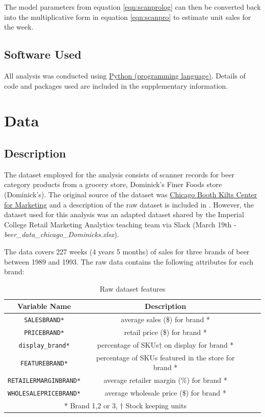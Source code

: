\documentclass[a4paper,11pt]{article}
\begin{document}
The model parameters from equation \ref{eqn:scanprolog} can then be converted back into the multiplicative form in equation \ref{eqn:scanpro} to estimate unit sales for the week.


\subsection{Software Used}

All analysis was conducted using \href{https://www.python.org/}{Python (programming language)}. Details of code and packages used are included in the supplementary information.


\section{Data}
\subsection{Description}
The dataset employed for the analysis consists of scanner records for beer category products from a grocery store, Dominick's Finer Foods store (Dominick's). The original source of the dataset was  \href{https://www.chicagobooth.edu/research/kilts/datasets/dominicks}{Chicago Booth Kilts Center for Marketing} and a description of the raw dataset is included in \citet{srinivasan_promotions_2004}. However, the dataset used for this analysis was an adapted dataset shared by the Imperial College Retail Marketing Analytics teaching team via Slack (March 19th - \emph{beer\_data\_chicago\_Dominicks.xlsx}).

The data covers 227 weeks (4 years 5 months) of sales for three brands of beer between 1989 and 1993. The raw data contains the following attributes for each brand:

\begin{table}[htb]
 \centering
 \caption{Raw dataset features}\label{tab:data_features}
 \begin{tabular}{cccc}
 \toprule
  Variable Name & Description \\
  \midrule
  \texttt{SALESBRAND*}& average sales (\$) for brand * \\
  \texttt{PRICEBRAND*}	& retail price (\$) for brand * \\
  \texttt{display\_brand*}	& percentage of SKUs{$\dagger$} on display for brand * \\
  \texttt{FEATUREBRAND*}	& percentage of SKUs featured in the store for brand * \\
  \texttt{RETAILERMARGINBRAND*} & average retailer margin (\%) for brand * \\
  \texttt{WHOLESALEPRICEBRAND*} & average wholesale price (\$) for brand * \\
  \bottomrule
  \multicolumn{2}{c}{$*$ Brand 1,2 or 3, $\dagger$ Stock keeping units}
 \end{tabular}
\end{table}
\end{document}
